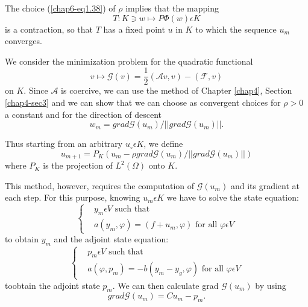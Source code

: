 The choice (\ref{chap6-eq1.38}) of $\rho$ implies that the mapping
\begin{equation*}
T : K \ni w \mapsto P \Phi (w) \epsilon K\tag{1.41}\label{chap6-eq1.41}
\end{equation*}\pageoriginale
is a contraction, so that $T$ has a fixed point $u$ in $K$ to which
the sequence $u_{m}$ converges. 
 
\medskip
{} We consider the minimization
problem for the quadratic functional 
\begin{equation*}
v \mapsto \mathscr{G} (v) = \frac{1}{2} (\mathscr{A} v, v) -
(\mathscr{F}, v)\tag{1.42}\label{chap6-eq1.42} 
\end{equation*}
on $K$. Since $\mathscr{A}$ is coercive, we can use the method of
Chapter \ref{chap4}, Section \ref{chap4-sec3} and we can show that we
can choose as convergent choices for $\rho > 0$ a constant and for the
direction of descent 
\begin{equation*}
w_{m} = grad \mathscr{G} (u_{m}) / ||grad \mathscr{G} (u_{m})||.\tag{1.43}\label{chap6-eq1.43}
\end{equation*}

Thus starting from an arbitrary $u_{\circ} \epsilon K$, we define
\begin{equation*}
u_{m+1} = P_{K} (u_{m} - \rho grad \mathscr{G} (u_{m}) / ||grad
\mathscr{G} (u_{m})||)\tag{1.44}\label{chap6-eq1.44} 
\end{equation*}
where $P_{K}$ is the projection of $L^{2} (\Omega)$ onto $K$.

This method, however, requires the computation of $\mathscr{G}
(u_{m})$ and its gradient at each step. For this purpose, knowing
$u_{m} \epsilon K$ we have to solve the state equation: 
\begin{equation*}
\begin{cases}
& y_{m} \epsilon V \text{ such that }\\
& a(y_{m}, \varphi) = (f + u_{m}, \varphi) \text{ for all } \varphi \epsilon V
\end{cases}
\end{equation*}
to obtain $y_{m}$ and the adjoint state equation:
\begin{equation*}
\begin{cases}
& p_{m} \epsilon V \text{ such that }\\
& a(\varphi, p_{m}) = -b(y_{m} - y_{g}, \varphi) \text{ for all } \varphi \epsilon V
\end{cases}
\end{equation*}
to\pageoriginale obtain the adjoint state $p_{m}$. We can then calculate grad $\mathscr{G} (u_{m})$ by using 
\begin{equation*}
grad \mathscr{G} (u_{m}) = Cu_{m} - p_{m}.\tag{1.45}\label{chap6-eq1.45}
\end{equation*}

